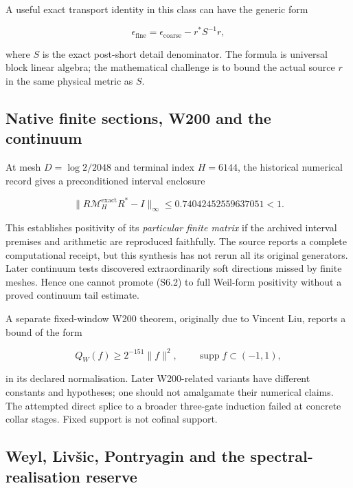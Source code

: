 \documentclass[
  10pt,
  a4paper,
  10pt,
  oneside,
  openany]{book}
\begin{document}
A useful exact transport identity in this class can have the generic
form

\[
\epsilon_{\mathrm{fine}}
=\epsilon_{\mathrm{coarse}}
-r^*S^{-1}r,
\tag{S6.1}\label{eq:S6.1}
\]

where \(S\) is the exact post-short detail denominator. The formula is
universal block linear algebra; the mathematical challenge is to bound
the actual source \(r\) in the same physical metric as \(S\).

\subsection{Native finite sections, W200 and the
continuum}\label{native-finite-sections-w200-and-the-continuum}

At mesh \(D=\log2/2048\) and terminal index \(H=6144\), the historical
numerical record gives a preconditioned interval enclosure

\[
\|R\mathcal M_H^{\mathrm{exact}}R^*-I\|_\infty
\le0.74042452559637051<1.
\tag{S6.2}\label{eq:S6.2}
\]

This establishes positivity of its \emph{particular finite matrix} if
the archived interval premises and arithmetic are reproduced faithfully.
The source reports a complete computational receipt, but this synthesis
has not rerun all its original generators. Later continuum tests
discovered extraordinarily soft directions missed by finite meshes.
Hence one cannot promote (S6.2) to full Weil-form positivity without a
proved continuum tail estimate.

A separate fixed-window W200 theorem, originally due to Vincent Liu,
reports a bound of the form

\[
Q_W(f)\ge2^{-151}\|f\|^2,
\qquad \operatorname{supp}f\subset(-1,1),
\tag{S6.3}\label{eq:S6.3}
\]

in its declared normalisation. Later W200-related variants have
different constants and hypotheses; one should not amalgamate their
numerical claims. The attempted direct splice to a broader three-gate
induction failed at concrete collar stages. Fixed support is not cofinal
support.

\subsection{\texorpdfstring{Weyl, Liv\v{s}ic, Pontryagin and the
spectral-realisation
reserve}{Weyl, Livic, Pontryagin and the spectral-realisation reserve}}\label{weyl-livic-pontryagin-and-the-spectral-realisation-reserve}
\end{document}
